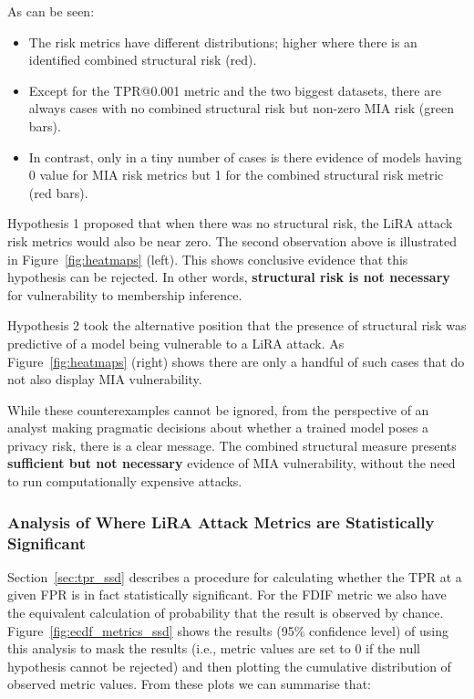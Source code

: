 

As can be seen:
\begin{itemize}
    \item The risk metrics have different distributions; higher where there is an identified combined structural risk (red).
    \item Except for the TPR@0.001 metric and the two biggest datasets, there are always cases with no combined structural risk but non-zero MIA risk (green bars).
    \item In contrast, only in a tiny number of cases is there evidence of models having 0 value for MIA risk metrics but 1 for the combined structural risk metric (red bars).
\end{itemize}

Hypothesis 1 proposed that when there was no structural risk, the LiRA attack risk metrics would also be near zero. The second observation above is illustrated in Figure~\ref{fig:heatmaps} (left). This shows conclusive evidence that this hypothesis can be rejected. In other words, \textbf{structural risk is not necessary} for vulnerability to membership inference.

Hypothesis 2 took the alternative position that the presence of structural risk was predictive of a model being vulnerable to a LiRA attack. As Figure~\ref{fig:heatmaps} (right) shows there are only a handful of such cases that do not also display MIA vulnerability. 



While these counterexamples cannot be ignored, from the perspective of an analyst making pragmatic decisions about whether a trained model poses a privacy risk, there is a clear message. The combined structural measure presents \textbf{sufficient but not necessary} evidence of MIA vulnerability, without the need to run computationally expensive attacks.

\subsubsection{Analysis of Where LiRA Attack Metrics are Statistically Significant}

Section~\ref{sec:tpr_ssd} describes a procedure for calculating whether the TPR at a given FPR is in fact statistically significant. For the FDIF metric we also have the equivalent calculation of probability that the result is observed by chance. Figure~\ref{fig:ecdf_metrics_ssd} shows the results (95\% confidence level) of using this analysis to mask the results (i.e., metric values are set to 0 if the null hypothesis cannot be rejected) and then plotting the cumulative distribution of observed metric values. From these plots we can summarise that:

